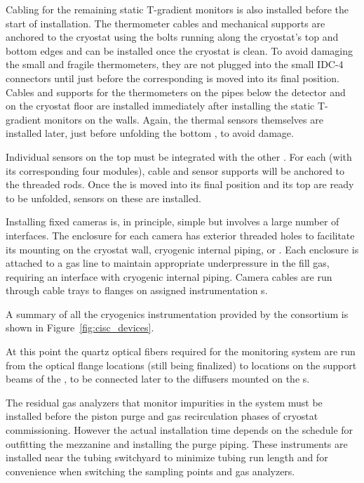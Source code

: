 Cabling for the remaining static T-gradient monitors is also installed %
before the start of  installation.  The thermometer cables and mechanical supports are anchored to the cryostat using the bolts running along the cryostat's top and bottom edges and can be installed once the cryostat is clean. 
To avoid  damaging the small and fragile thermometers, they are not plugged into the small IDC-4 connectors until just before the corresponding  is moved into its final position. 
Cables and supports for the thermometers on the pipes below the detector and on the cryostat floor are installed immediately after installing the static T-gradient monitors on the walls.  Again, the thermal sensors themselves are installed later, just before unfolding the bottom , to avoid damage.

Individual sensors on the top  must be integrated with the other . For each  (with its corresponding four  modules), cable and sensor supports will be anchored to the  threaded rods. Once the  is moved into its final position and its top  are ready to be unfolded, sensors on these  are installed.

 
Installing fixed cameras is, in principle, simple but involves a large number of interfaces. The enclosure for each camera has exterior threaded holes to facilitate its mounting %
on the cryostat wall, cryogenic internal piping, or . Each enclosure is attached to a gas line to maintain appropriate underpressure in the fill gas, requiring an interface with cryogenic internal piping. Camera cables are run through cable trays to flanges on assigned instrumentation \fdth{}s. 


A summary of all the cryogenics instrumentation provided by the  consortium is shown in Figure~\ref{fig:cisc_devices}. 

At this point the quartz optical fibers required for the  monitoring system are run from the optical flange locations (still being finalized) to locations on the  support beams of the , to be connected later to the diffusers mounted on the s.


The residual gas analyzers that monitor %
impurities in the  system must be installed before the piston purge and gas recirculation phases of cryostat commissioning.  However the actual installation time %
depends on the schedule for outfitting the mezzanine and installing the   purge piping. These  instruments are installed near the tubing switchyard to minimize tubing run length and for convenience when switching the sampling points and gas analyzers. 

